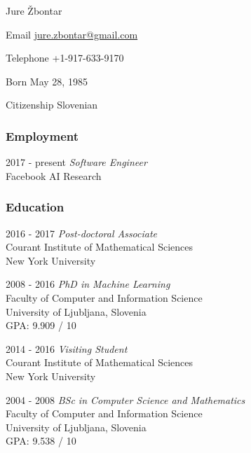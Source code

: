 \documentclass[12pt,a4paper]{article}
\begin{document}
\begin{cv}{Jure \v{Z}bontar}

\begin{cvlist}{}
\item[Email] \href{mailto:jure.zbontar@gmail.com}{jure.zbontar@gmail.com}
\item[Telephone] +1-917-633-9170
\item[Born] May 28, 1985
\item[Citizenship] Slovenian

\end{cvlist}

\subsubsection*{Employment}
\begin{cvlist}{}
\item[2017 - present] \emph{Software Engineer} \\
Facebook AI Research
\end{cvlist}

\subsubsection*{Education}
\begin{cvlist}{}

\item[2016 - 2017] \emph{Post-doctoral Associate} \\
Courant Institute of Mathematical Sciences \\
New York University

\item[2008 - 2016] \emph{PhD in Machine Learning} \\
Faculty of Computer and Information Science \\
University of Ljubljana, Slovenia \\
GPA: 9.909 / 10

\item[2014 - 2016] \emph{Visiting Student} \\
Courant Institute of Mathematical Sciences \\
New York University

\item[2004 - 2008] \emph{BSc in Computer Science and Mathematics} \\
Faculty of Computer and Information Science \\
University of Ljubljana, Slovenia \\
GPA: 9.538 / 10


\end{cvlist}
\end{cv}
\end{document}
